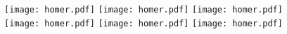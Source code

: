\texttt{[image: homer.pdf]}
\texttt{[image: homer.pdf]}
\texttt{[image: homer.pdf]} \\
\texttt{[image: homer.pdf]}
\texttt{[image: homer.pdf]}
\texttt{[image: homer.pdf]} \\
